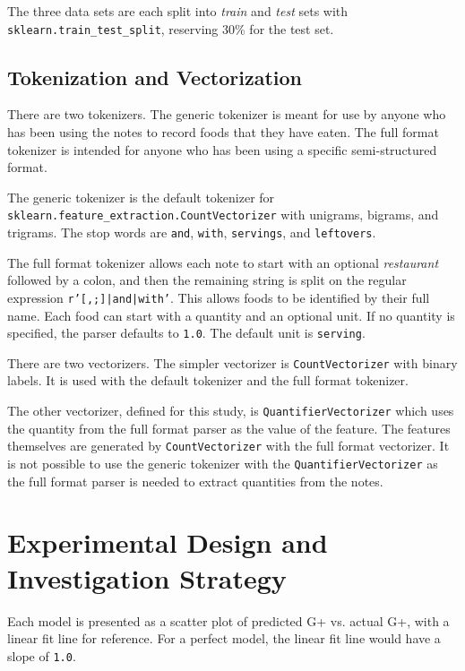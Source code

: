 \documentclass[conference]{IEEEtran}
\begin{document}
The three data sets are each split into \emph{train} and \emph{test} sets with \texttt{sklearn.train\_test\_split}, reserving 30\% for the test set.

\subsection{Tokenization and Vectorization}

There are two tokenizers. The generic tokenizer is meant for use by anyone who has been using the notes to record foods that they have eaten. The full format tokenizer is intended for anyone who has been using a specific semi-structured format.

The generic tokenizer is the default tokenizer for \texttt{sklearn.feature\_extraction.CountVectorizer} with unigrams, bigrams, and trigrams. The stop words are \texttt{and}, \texttt{with}, \texttt{servings}, and \texttt{leftovers}.

The full format tokenizer allows each note to start with an optional \emph{restaurant} followed by a colon, and then the remaining string is split on the regular expression \texttt{r'[,;]|and|with'}. This allows foods to be identified by their full name. Each food can start with a quantity and an optional unit. If no quantity is specified, the parser defaults to \texttt{1.0}. The default unit is \texttt{serving}.

There are two vectorizers. The simpler vectorizer is \texttt{CountVectorizer} with binary labels. It is used with the default tokenizer and the full format tokenizer.

The other vectorizer, defined for this study, is \texttt{QuantifierVectorizer} which uses the quantity from the full format parser as the value of the feature. The features themselves are generated by \texttt{CountVectorizer} with the full format vectorizer. It is not possible to use the generic tokenizer with the \texttt{QuantifierVectorizer} as the full format parser is needed to extract quantities from the notes.

\section{Experimental Design and Investigation Strategy}

Each model is presented as a scatter plot of predicted G+ vs. actual G+, with a linear fit line for reference. For a perfect model, the linear fit line would have a slope of \texttt{1.0}.
\end{document}

